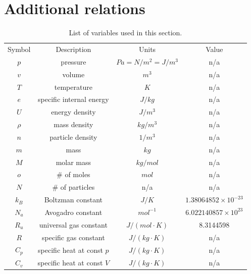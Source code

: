 \documentclass[oneside,a4paper,11pt]{report}
\begin{document}
\section{Additional relations}
\begin{table}
\centering
\caption{List of variables used in this section.}
\begin{tabular}{ c | c | c | c}
Symbol & Description & Units & Value \\
\hhline{=|=|=|=}
$p$ & pressure & $Pa = N/m^2 = J/m^3$ & n/a \\
\hline
$v$ & volume & $m^3$ & n/a \\
\hline
$T$ & temperature & $K$ & n/a \\
\hline
$e$ & specific internal energy & $J/kg$ & n/a \\
\hline
$U$ & energy density & $J/m^3$ & n/a \\
\hline
$\rho$ & mass density & $kg/m^3$ & n/a \\
\hline
$n$ & particle density & $1/m^3$ & n/a \\
\hline
$m$ & mass & $kg$ & n/a \\
\hline
$M$ & molar mass & $kg/mol$ & n/a \\
\hline
$o$ & \# of moles & $mol$ & n/a \\
\hline
$N$ & \# of particles & n/a & n/a \\
\hline
$k_B$ & Boltzman constant & $J/K$ & $1.38064852 \times 10^{-23}$ \\
\hline
$N_a$ & Avogadro constant & $mol^{-1}$ & $6.022140857 \times 10^{23}$ \\ 
\hline
$R_u$ & universal gas constant & $ J/(mol \cdot K)$ & 8.3144598 \\
\hline
$R$ & specific gas constant & $J/ (kg \cdot K)$ & n/a \\
\hline
$C_p$ & specific heat at const $p$ & $J/ (kg \cdot K)$ & n/a \\
\hline
$C_v$ & specific heat at const $V$ & $J/ (kg \cdot K)$ & n/a
\end{tabular}
\end{table}
\end{document}
